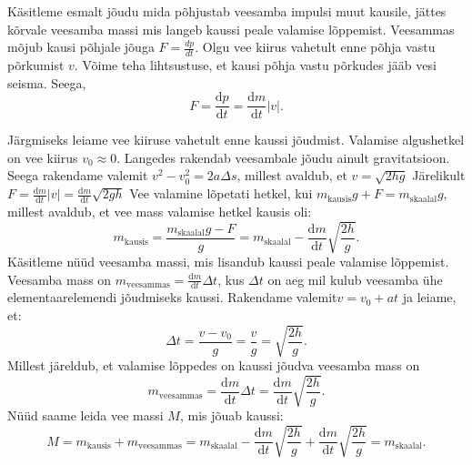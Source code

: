 \documentclass[10pt]{article}
\begin{document}
\solu
Käsitleme esmalt jõudu mida põhjustab veesamba impulsi muut kausile, jättes kõrvale veesamba massi mis langeb kaussi peale valamise lõppemist. Veesammas mõjub kausi põhjale jõuga $F=\frac{dp}{dt}$. Olgu vee kiirus vahetult enne põhja vastu põrkumist $v$. Võime teha lihtsustuse, et kausi põhja vastu põrkudes jääb vesi seisma. Seega,
\[
F=\frac{\mathrm{d}{p}}{\mathrm{d}{t}}=\frac{\mathrm{d}{m}}{\mathrm{d}{t}} |v|.
\]\par 
\noindent Järgmiseks leiame vee kiiruse vahetult enne kaussi jõudmist.  Valamise algushetkel on vee kiirus $v_0\approx 0$. Langedes rakendab veesambale jõudu ainult gravitatsioon. Seega rakendame valemit $v^2-v_0^2=2a\Delta s$, millest avaldub, et $v=\sqrt{2hg}$
Järelikult $F=\frac{\mathrm{d}{m}}{\mathrm{d}{t}} |v|=\frac{\mathrm{d}{m}}{\mathrm{d}{t}}\sqrt{2gh}$
Vee valamine lõpetati hetkel, kui $m_{\mathrm{kausis}} g+F=m_\mathrm{skaalal}g$, millest avaldub, et vee mass valamise hetkel kausis oli:
\begin{equation*}
m_{\mathrm{kausis}}=\frac{m_{\mathrm{skaalal}} g-F}{g}=m_{\mathrm{skaalal}}-\frac{\mathrm{d}{m}}{\mathrm{d}{t}}\sqrt{\frac{2h}{g}}.
\end{equation*}
Käsitleme nüüd veesamba massi, mis lisandub kaussi peale valamise lõppemist. Veesamba mass on $m_{\mathrm{veesammas}}=\frac{\mathrm{d}{m}}{\mathrm{d}{t}}\Delta t$, kus $\Delta t$ on aeg mil kulub veesamba ühe elementaarelemendi jõudmiseks kaussi. Rakendame valemit$v=v_0+at$ ja leiame, et:
\begin{equation*}
\Delta t = \frac{v-v_0}{g}=\frac{v}{g}=\sqrt{\frac{2h}{g}}.
\end{equation*}
Millest järeldub, et valamise lõppedes on kaussi jõudva veesamba mass on
\begin{equation*}
m_{\mathrm{veesammas}}=\frac{\mathrm{d}{m}}{\mathrm{d}{t}} \Delta t = \frac{\mathrm{d}{m}}{\mathrm{d}{t}}\sqrt{\frac{2h}{g}}.
\end{equation*}
Nüüd saame leida vee massi $M$, mis jõuab kaussi:
\begin{equation*}
M=m_{\mathrm{kausis}}+m_{\mathrm{veesammas}}=m_{\mathrm{skaalal}}-\frac{\mathrm{d}{m}}{\mathrm{d}{t}}\sqrt{\frac{2h}{g}}+\frac{\mathrm{d}{m}}{\mathrm{d}{t}}\sqrt{\frac{2h}{g}}=m_{\mathrm{skaalal}}.
\end{equation*}
\probend
\bigskip

\end{document}
